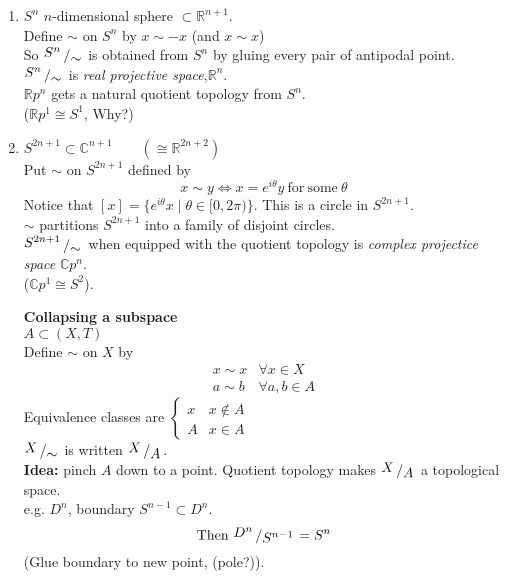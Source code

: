 \documentclass{article}
\newcommand{\R}{\mathbb{R}}
\newcommand{\C}{\mathbb{C}}
\newcommand{\quotient}[2]{{\raisebox{.2em}{$#1$}\left/\raisebox{-.2em}{$#2$}\right.}}
\theoremstyle{remark}
\theoremstyle{example}
\theoremstyle{examples}
\begin{document}
\begin{enumerate}
		\item $S^n$ $n$-dimensional sphere $\subset \R^{n+1}$.\\
		Define $\sim$ on $S^n$ by $x \sim -x$ (and $x \sim x$)\\
		So $\quotient{S^n}{\sim}$ is obtained from $S^n$ by gluing every pair of antipodal point.\\
		$\quotient{S^n}{\sim}$ is \textit{real projective space},$\R ^n$.\\
		$\R p^n$ gets a natural quotient topology from $S^n$.\\
		($\R p^1 \cong S^1$, Why?)
		\item $S^{2n+1} \subset \C^{n+1}\qquad(\cong \R^{2n+2})$\\
		Put $\sim$ on $S^{2n+1}$ defined by \[x \sim y \iff x=e^{i \theta}y\ \mathrm{for\ some}\ \theta\]
		Notice that $[x]=\{e^{i\theta} x \mid \theta \in [0,2 \pi)\}$. This is a circle in $S^{2n+1}$.\\
		$\sim$ partitions $S^{2n+1}$ into a family of disjoint circles.\\
		$\quotient{S^{2n+1}}{\sim}$ when equipped with the quotient topology is \textit{complex projectice space} $\C p^n$.\\
		($\C p^1 \cong S^2$).
		
		\textbf{Collapsing a subspace}\\
		$A \subset (X,T)$\\
		Define $\sim$ on $X$ by \[\begin{matrix}
			x \sim x & \forall x \in X\\
			a \sim b & \forall a,b \in A
		\end{matrix}\]
		Equivalence classes are $\begin{cases}
			{x} & x \notin A\\
			A & x \in A
		\end{cases}$\\
		$\quotient{X}{\sim}$ is written $\quotient{X}{A}$.\\
		\textbf{Idea:} pinch $A$ down to a point. Quotient topology makes $\quotient{X}{A}$ a topological space.\\
		e.g. $D^n$, boundary $S^{n-1}\subset D^n$.\\
		\[\mathrm{Then}\ \quotient{D^n}{S^{n-1}}=S^n\]
		(Glue boundary to new point, (pole?)).
		
	\end{enumerate}
\end{document}
